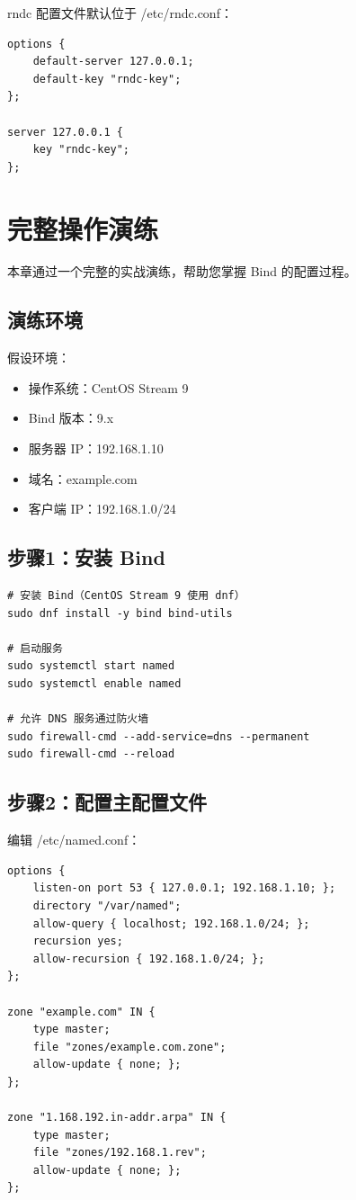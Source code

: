 \documentclass[12pt,UTF8]{ctexbook}
\begin{document}
rndc 配置文件默认位于 /etc/rndc.conf：

\begin{verbatim}
options {
    default-server 127.0.0.1;
    default-key "rndc-key";
};

server 127.0.0.1 {
    key "rndc-key";
};
\end{verbatim}

\chapter{完整操作演练}
\label{chap:practice}

本章通过一个完整的实战演练，帮助您掌握 Bind 的配置过程。

\section{演练环境}
\label{sec:practice_env}

假设环境：
\begin{itemize}
    \item 操作系统：CentOS Stream 9
    \item Bind 版本：9.x
    \item 服务器 IP：192.168.1.10
    \item 域名：example.com
    \item 客户端 IP：192.168.1.0/24
\end{itemize}

\section{步骤1：安装 Bind}
\label{sec:practice_step1}

\begin{verbatim}
# 安装 Bind（CentOS Stream 9 使用 dnf）
sudo dnf install -y bind bind-utils

# 启动服务
sudo systemctl start named
sudo systemctl enable named

# 允许 DNS 服务通过防火墙
sudo firewall-cmd --add-service=dns --permanent
sudo firewall-cmd --reload
\end{verbatim}

\section{步骤2：配置主配置文件}
\label{sec:practice_step2}

编辑 /etc/named.conf：
\begin{verbatim}
options {
    listen-on port 53 { 127.0.0.1; 192.168.1.10; };
    directory "/var/named";
    allow-query { localhost; 192.168.1.0/24; };
    recursion yes;
    allow-recursion { 192.168.1.0/24; };
};

zone "example.com" IN {
    type master;
    file "zones/example.com.zone";
    allow-update { none; };
};

zone "1.168.192.in-addr.arpa" IN {
    type master;
    file "zones/192.168.1.rev";
    allow-update { none; };
};
\end{verbatim}
\end{document}
